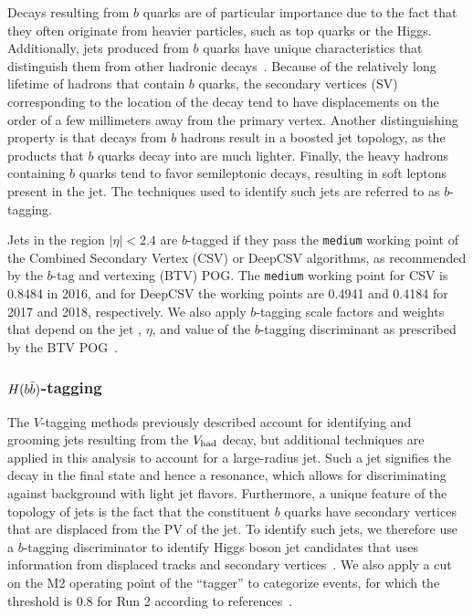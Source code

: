 Decays resulting from $b$ quarks are of particular importance due to the fact that they often originate from heavier particles, such as top quarks or the Higgs.
Additionally, jets produced from $b$ quarks have unique characteristics that distinguish them from other hadronic decays~\cite{Sirunyan_jet}.
Because of the relatively long lifetime of hadrons that contain $b$ quarks, the secondary vertices (SV) corresponding to the location of the decay tend to have displacements on the order of a few millimeters away from the primary vertex.
Another distinguishing property is that decays from $b$ hadrons result in a boosted jet topology, as the products that $b$ quarks decay into are much lighter.
Finally, the heavy hadrons containing $b$ quarks tend to favor semileptonic decays, resulting in soft leptons present in the jet.
The techniques used to identify such jets are referred to as $b$-tagging.

Jets in the region $|\eta|<2.4$ are $b$-tagged if they pass the \texttt{medium} working point of the Combined Secondary Vertex (CSV) or DeepCSV algorithms, as recommended by the $b$-tag and vertexing (BTV) POG.
The \texttt{medium} working point for CSV is 0.8484 in 2016, and for DeepCSV the working points are 0.4941 and 0.4184 for 2017 and 2018, respectively. %
We also apply $b$-tagging scale factors and weights that depend on the jet \pt, $\eta$, and value of the $b$-tagging discriminant as prescribed by the BTV POG~\cite{bTaggingEff,bTaggingSF}.

\subsubsection{$H(b\bar{b})$-tagging}

The $V$-tagging methods previously described account for identifying and grooming jets resulting from the $V_\mathrm{had}$ decay, but additional techniques are applied in this analysis to account for a large-radius \bbbar jet.
Such a jet signifies the decay \Htobbbar in the final state and hence a \WH resonance, which allows for discriminating against background with light jet flavors.
Furthermore, a unique feature of the topology of \bbbar jets is the fact that the constituent $b$ quarks have secondary vertices that are displaced from the PV of the jet.
To identify such \bbbar jets, we therefore use a $b$-tagging discriminator to identify Higgs boson jet candidates that uses information from displaced tracks and secondary vertices~\cite{CMS-PAS-BTV-15-002}.
We also apply a cut on the M2 operating point of the ``\DoubleB tagger'' to categorize events, for which the threshold is 0.8 for Run 2 according to references~\cite{bTagging2016,bTagging2017,bTagging2018}.

